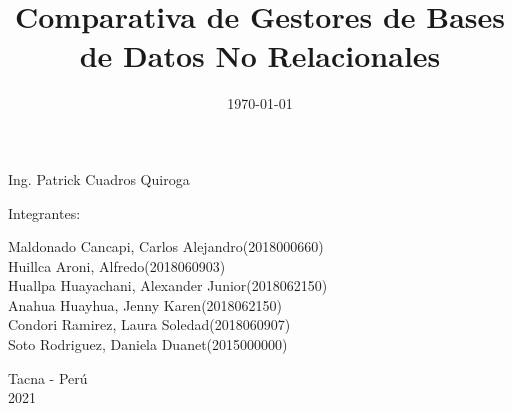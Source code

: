 \documentclass[twoside,twocolumn]{article}
\begin{document}
\begin{titlepage}
\begin{center}
\vspace*{0.1in}
\begin{large}
 Ing. Patrick Cuadros Quiroga\\
\end{large}

\vspace*{0.2in}
\vspace*{0.1in}
\begin{large}

Integrantes: \\
\begin{flushleft}
Maldonado Cancapi, Carlos Alejandro\hfill(2018000660) \\
Huillca Aroni, Alfredo\hfill(2018060903)\\
Huallpa Huayachani, Alexander Junior\hfill(2018062150)\\
Anahua Huayhua, Jenny Karen\hfill(2018062150)\\
Condori Ramirez, Laura Soledad\hfill(2018060907)\\
Soto Rodriguez, Daniela Duanet\hfill(2015000000)\\

\end{flushleft}
\end{large}

\vspace*{0.1in}
\begin{large}
Tacna - Perú\\
2021
\end{large}
\end{center}
\end{titlepage}

\setlength{\droptitle}{-4\baselineskip} %

\pretitle{\begin{center}\Huge\bfseries} %
\posttitle{\end{center}} %
\title{Comparativa de Gestores de Bases de Datos No Relacionales} %

\date{\today} %
\renewcommand{\maketitlehookd}{%

}




\maketitle
\end{document}
